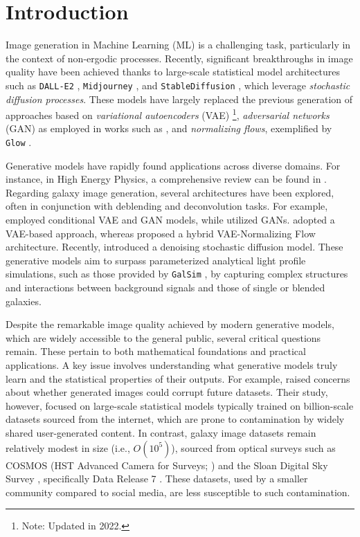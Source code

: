 \documentclass[fleqn,usenatbib]{mnras}
\begin{document}
\section{Introduction}
\label{sec:Intro}
Image generation in Machine Learning (ML) is a challenging task, particularly in the context of non-ergodic processes. Recently, significant breakthroughs in image quality have been achieved thanks to large-scale statistical model architectures such as \texttt{DALL-E2} \citep{ramesh2022}, \texttt{Midjourney} \citep{Oppenlaender2022}, and \texttt{StableDiffusion} \citep{Rombach2022}, which leverage \textit{stochastic diffusion processes}. These models have largely replaced the previous generation of approaches based on \textit{variational autoencoders} (VAE) \citep{Kingma2014}\footnote{Note: Updated in 2022.}, \textit{adversarial networks} (GAN) \citep{goodfellow2014generative} as employed in works such as \citep[e.g.,][]{KarrasALL18,Brock2019}, and \textit{normalizing flows}, exemplified by \texttt{Glow} \citep{Kingma2018}. 

Generative models have rapidly found applications across diverse domains. For instance, in High Energy Physics, a comprehensive review can be found in \cite{PhysRevD.107.076017}. Regarding galaxy image generation, several architectures have been explored, often in conjunction with deblending and deconvolution tasks. For example, \cite{ravanbakhsh2016} employed conditional VAE and GAN models, while \citep{Schawinski2017,Fussell2019,Hemmati_2022} utilized GANs. \cite{Arcelin2020} adopted a VAE-based approach, whereas \cite{Lanusse2021} proposed a hybrid VAE-Normalizing Flow architecture. Recently, \cite{smith2021} introduced a denoising stochastic diffusion model. These generative models aim to surpass parameterized analytical light profile simulations, such as those provided by \texttt{GalSim} \citep{ROWE2015121}, by capturing complex structures and interactions between background signals and those of single or blended galaxies. 

Despite the remarkable image quality achieved by modern generative models, which are widely accessible to the general public, several critical questions remain. These pertain to both mathematical foundations and practical applications. A key issue involves understanding what generative models truly learn and the statistical properties of their outputs. For example, \cite{Hataya2023} raised concerns about whether generated images could corrupt future datasets. Their study, however, focused on large-scale statistical models typically trained on billion-scale datasets sourced from the internet, which are prone to contamination by widely shared user-generated content. In contrast, galaxy image datasets remain relatively modest in size (i.e., $O(10^5)$), sourced from optical surveys such as COSMOS (HST Advanced Camera for Surveys; \cite{mandelbaum_2019_3242143}) and the Sloan Digital Sky Survey \citep[SDSS;][]{sdss}, specifically Data Release 7 \citep{sdssdr7}. These datasets, used by a smaller community compared to social media, are less susceptible to such contamination.
\end{document}
